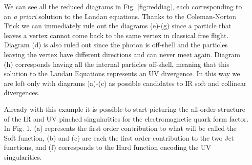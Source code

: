 \documentclass[%
 reprint,
 amsmath,amssymb,
 aps,
]{revtex4-1}
\begin{document}
 We can see all the reduced diagrams in Fig. \ref{fig:reddiag}, each corresponding to an \textit{a priori} solution to the Landau equations. Thanks to the Coleman-Norton Trick we can immediately rule out the diagrams (e)-(g) since a particle that leaves a vertex cannot come back to the same vertex in classical free flight. Diagram (d) is also ruled out since the photon is off-shell and the particles leaving the vertex have different directions and can never meet again. Diagram (h) corresponds having all the internal particles off-shell, meaning that this solution to the Landau Equations represents an UV divergence. In this way we are left only with diagrams (a)-(c) as possible candidates to IR soft and collinear divergences.


Already with this example it is possible to start picturing the all-order structure of the IR and UV pinched singularities for the electromagnetic quark form factor. In Fig. 1, (a) represents the first order contribution to what will be called the Soft function,  (b) and (c) are each the first order contribution to the two Jet functions, and (f) corresponds to the Hard function encoding the UV singularities.\par
\end{document}
